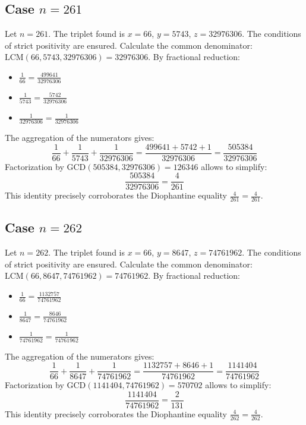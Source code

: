 \documentclass[11pt,a4paper]{article}
\begin{document}
\subsection{Case $n = 261$}
Let $n = 261$. The triplet found is $x = 66$, $y = 5743$, $z = 32976306$.
The conditions of strict positivity are ensured.
Calculate the common denominator: $\text{LCM}(66, 5743, 32976306) = 32976306$.
By fractional reduction:
\begin{itemize}
    \item $\frac{1}{66} = \frac{499641}{32976306}$
    \item $\frac{1}{5743} = \frac{5742}{32976306}$
    \item $\frac{1}{32976306} = \frac{1}{32976306}$
\end{itemize}
The aggregation of the numerators gives:
$$ \frac{1}{66} + \frac{1}{5743} + \frac{1}{32976306} = \frac{499641 + 5742 + 1}{32976306} = \frac{505384}{32976306} $$
Factorization by $\text{GCD}(505384, 32976306) = 126346$ allows to simplify:
$$ \frac{505384}{32976306} = \frac{4}{261} $$
This identity precisely corroborates the Diophantine equality $\frac{4}{261} = \frac{4}{261}$.

\subsection{Case $n = 262$}
Let $n = 262$. The triplet found is $x = 66$, $y = 8647$, $z = 74761962$.
The conditions of strict positivity are ensured.
Calculate the common denominator: $\text{LCM}(66, 8647, 74761962) = 74761962$.
By fractional reduction:
\begin{itemize}
    \item $\frac{1}{66} = \frac{1132757}{74761962}$
    \item $\frac{1}{8647} = \frac{8646}{74761962}$
    \item $\frac{1}{74761962} = \frac{1}{74761962}$
\end{itemize}
The aggregation of the numerators gives:
$$ \frac{1}{66} + \frac{1}{8647} + \frac{1}{74761962} = \frac{1132757 + 8646 + 1}{74761962} = \frac{1141404}{74761962} $$
Factorization by $\text{GCD}(1141404, 74761962) = 570702$ allows to simplify:
$$ \frac{1141404}{74761962} = \frac{2}{131} $$
This identity precisely corroborates the Diophantine equality $\frac{4}{262} = \frac{4}{262}$.
\end{document}
